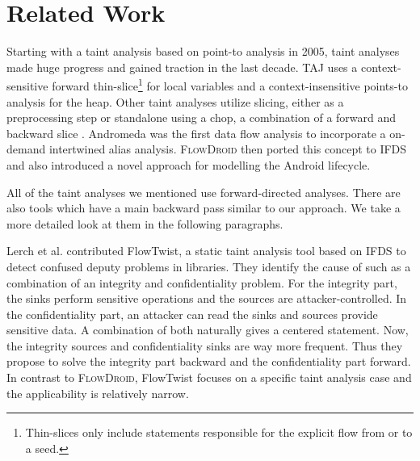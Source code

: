\documentclass[../draft.tex]{subfiles}
\begin{document}
    \chapter{Related Work}
    Starting with a taint analysis based on point-to analysis \cite{Livshits2005} in 2005, taint analyses made huge progress and gained traction in the last decade. 
    TAJ\cite{Tripp2009} uses a context-sensitive forward thin-slice\footnote{Thin-slices only include statements responsible for the explicit flow from or to a seed.} for local variables and a context-insensitive points-to analysis for the heap. 
    Other taint analyses utilize slicing, either as a preprocessing step \cite{} or standalone using a chop, a combination of a forward and backward slice \cite{Titze2015}.
    Andromeda\cite{Tripp2013} was the first data flow analysis to incorporate a on-demand intertwined alias analysis. 
    \textsc{FlowDroid}\cite{Arzt2014} then ported this concept to IFDS and also introduced a novel approach for modelling the Android lifecycle.

    All of the taint analyses we mentioned use forward-directed analyses.
    There are also tools which have a main backward pass similar to our approach. We take a more detailed look at them in the following paragraphs. 

    Lerch et al.\cite{Lerch2014} contributed FlowTwist, a static taint analysis tool based on IFDS to detect confused deputy problems\footnotemark{} in libraries.
    They identify the cause of such as a combination of an integrity and confidentiality problem. 
    For the integrity part, the sinks perform sensitive operations and the sources are attacker-controlled. 
    In the confidentiality part, an attacker can read the sinks and sources provide sensitive data.
    A combination of both naturally gives a centered statement. 
    Now, the integrity sources and confidentiality sinks are way more frequent. 
    Thus they propose to solve the integrity part backward and the confidentiality part forward. 
    In contrast to \textsc{FlowDroid}, FlowTwist focuses on a specific taint analysis case and the applicability is relatively narrow. 
\end{document}

